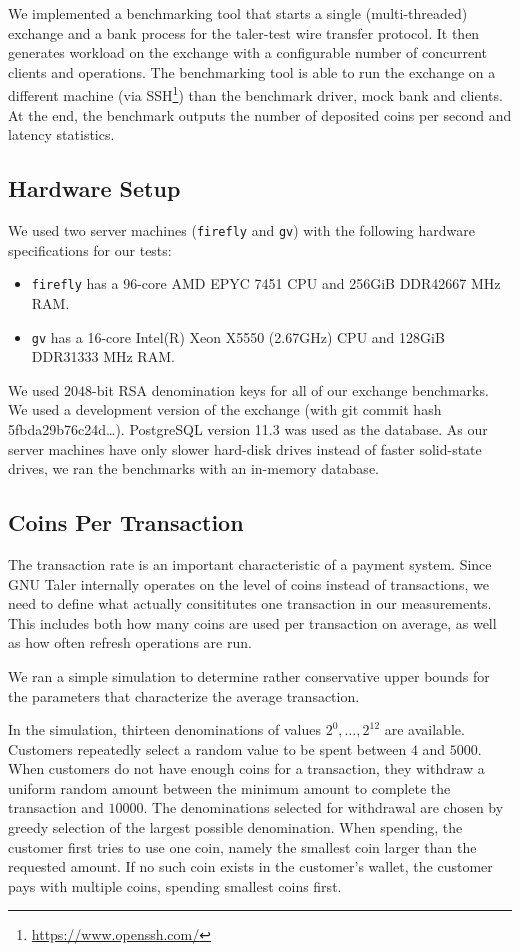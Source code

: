 We implemented a benchmarking tool that starts a single (multi-threaded)
exchange and a bank process for the taler-test wire transfer protocol. It then
generates workload on the exchange with a configurable number of concurrent
clients and operations.  The benchmarking tool is able to run the exchange on a
different machine (via SSH\footnote{\url{https://www.openssh.com/}}) than the benchmark driver, mock bank and clients.
At the end, the benchmark outputs the number of deposited coins per second and
latency statistics.

\subsection{Hardware Setup}
We used two server machines (\texttt{firefly} and \texttt{gv}) with the following
hardware specifications for our tests:
\begin{itemize}
  \item \texttt{firefly} has a 96-core AMD EPYC 7451 CPU and 256GiB DDR4\@2667 MHz RAM.
  \item \texttt{gv} has a 16-core Intel(R) Xeon X5550 (2.67GHz) CPU and 128GiB DDR3\@1333 MHz RAM.
\end{itemize}

We used $2048$-bit RSA denomination keys for all of our exchange benchmarks.  We
used a  development version of the exchange (with git commit hash
5fbda29b76c24d\dots).  PostgreSQL version 11.3 was used as the database.
As our server machines have only slower hard-disk drives instead of faster solid-state drives,
we ran the benchmarks with an in-memory database.


\subsection{Coins Per Transaction}\label{sec:coins-per-transaction}
The transaction rate is an important characteristic of a payment system.  Since
GNU Taler internally operates on the level of coins instead of transactions, we
need to define what actually consititutes one transaction in our measurements.
This includes both how many coins are used per transaction on average, as well
as how often refresh operations are run.

We ran a simple simulation to determine rather conservative upper bounds for
the parameters that characterize the average transaction.  

In the simulation, thirteen denominations of values $2^0,\dots,2^{12}$ are
available.  Customers repeatedly select a random value to be spent between $4$ and $5000$.
When customers do not have enough coins for a transaction, they withdraw a
uniform random amount between the minimum amount to complete the transaction
and $10000$.  The denominations selected for withdrawal are chosen by greedy
selection of the largest possible denomination.  When spending, the customer
first tries to use one coin, namely the smallest coin larger than the
requested amount.  If no such coin exists in the customer's wallet, the
customer pays with multiple coins, spending smallest coins first.


